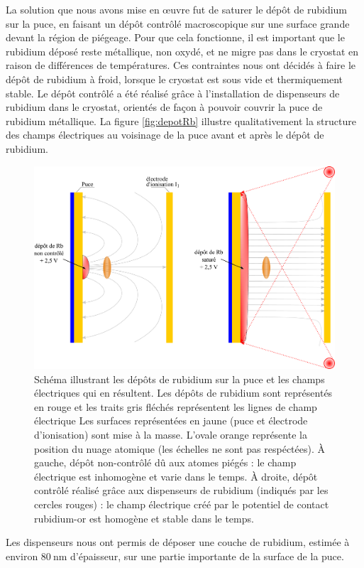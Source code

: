 La solution que nous avons mise en \oe uvre fut de saturer le dépôt de rubidium sur la puce, en faisant un dépôt contrôlé macroscopique sur une surface grande devant la région de piégeage.
Pour que cela fonctionne, il est important que le rubidium déposé reste métallique, non oxydé, et ne migre pas dans le cryostat en raison de différences de températures.
Ces contraintes nous ont décidés à faire le dépôt de rubidium à froid, lorsque le cryostat est sous vide et thermiquement stable.
Le dépôt contrôlé a été réalisé grâce à l'installation de dispenseurs de rubidium dans le cryostat, orientés de façon à pouvoir couvrir la puce de rubidium métallique.
La figure \eqref{fig:depotRb} illustre qualitativement la structure des champs électriques au voisinage de la puce avant et après le dépôt de rubidium.
%
\begin{figure}[h]
\centering
\includegraphics[width=.7\linewidth]{figures/setup/rydberg/depotRb}
\caption[Dépôt contrôlé de rubidium sur la puce]{
Schéma illustrant les dépôts de rubidium sur la puce et les champs électriques qui en résultent.
Les dépôts de rubidium sont représentés en rouge et les traits gris fléchés représentent les lignes de champ électrique
Les surfaces représentées en jaune (puce et électrode d'ionisation) sont mise à la masse.
L'ovale orange représente la position du nuage atomique (les échelles ne sont pas respéctées).
\`A gauche, dépôt non-contrôlé dû aux atomes piégés : le champ électrique est inhomogène  et varie dans le temps.
\`A droite, dépôt contrôlé réalisé grâce aux dispenseurs de rubidium (indiqués par les cercles rouges) : le champ électrique créé par le potentiel de contact rubidium-or est homogène et stable dans le temps.
}
\label{fig:depotRb}
\end{figure}
%
Les dispenseurs nous ont permis de déposer une couche de rubidium, estimée à environ $\SI{80}{\nano\meter}$ d'épaisseur, sur une partie importante de la surface de la puce.

